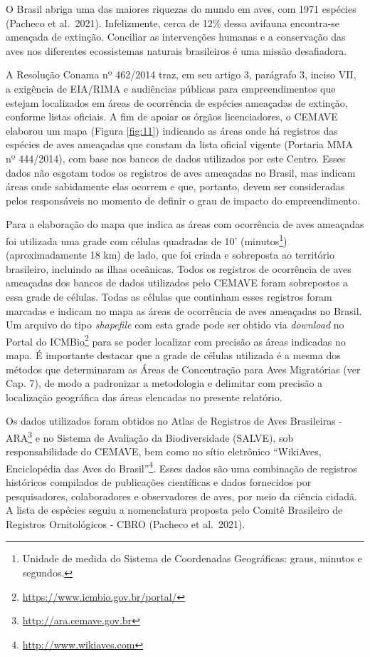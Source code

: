 \documentclass[
  oneside]{scrbook}
\DeclareRobustCommand{\href}[2]{#2\footnote{\url{#1}}}
\begin{document}
O Brasil abriga uma das maiores riquezas do mundo em aves, com 1971 espécies (Pacheco et al.~2021). Infelizmente, cerca de 12\% dessa avifauna encontra-se ameaçada de extinção. Conciliar as intervenções humanas e a conservação das aves nos diferentes ecossistemas naturais brasileiros é uma missão desafiadora.

A Resolução Conama nº 462/2014 traz, em seu artigo 3, parágrafo 3, inciso VII, a exigência de EIA/RIMA e audiências públicas para empreendimentos que estejam localizados em áreas de ocorrência de espécies ameaçadas de extinção, conforme listas oficiais. A fim de apoiar os órgãos licenciadores, o CEMAVE elaborou um mapa (Figura \ref{fig:11}) indicando as áreas onde há registros das espécies de aves ameaçadas que constam da lista oficial vigente (Portaria MMA nº 444/2014), com base nos bancos de dados utilizados por este Centro. Esses dados não esgotam todos os registros de aves ameaçadas no Brasil, mas indicam áreas onde sabidamente elas ocorrem e que, portanto, devem ser consideradas pelos responsáveis no momento de definir o grau de impacto do empreendimento.

Para a elaboração do mapa que indica as áreas com ocorrência de aves ameaçadas foi utilizada uma grade com células quadradas de 10' (minutos\footnote{Unidade de medida do Sistema de Coordenadas Geográficas: graus, minutos e segundos.}) (aproximadamente 18 km) de lado, que foi criada e sobreposta ao território brasileiro, incluindo as ilhas oceânicas. Todos os registros de ocorrência de aves ameaçadas dos bancos de dados utilizados pelo CEMAVE foram sobrepostos a essa grade de células. Todas as células que continham esses registros foram marcadas e indicam no mapa as áreas de ocorrência de aves ameaçadas no Brasil. Um arquivo do tipo \emph{shapefile} com esta grade pode ser obtido via \emph{download} no \href{https://www.icmbio.gov.br/portal/}{Portal do ICMBio} para se poder localizar com precisão as áreas indicadas no mapa. É importante destacar que a grade de células utilizada é a mesma dos métodos que determinaram as Áreas de Concentração para Aves Migratórias (ver Cap. 7), de modo a padronizar a metodologia e delimitar com precisão a localização geográfica das áreas elencadas no presente relatório.

Os dados utilizados foram obtidos no \href{http://ara.cemave.gov.br}{Atlas de Registros de Aves Brasileiras - ARA} e no Sistema de Avaliação da Biodiversidade (SALVE), sob responsabilidade do CEMAVE, bem como no sítio eletrônico \href{http://www.wikiaves.com}{``WikiAves, Enciclopédia das Aves do Brasil''}. Esses dados são uma combinação de registros históricos compilados de publicações científicas e dados fornecidos por pesquisadores, colaboradores e observadores de aves, por meio da ciência cidadã. A lista de espécies seguiu a nomenclatura proposta pelo Comitê Brasileiro de Registros Ornitológicos - CBRO (Pacheco et al.~2021).
\end{document}

